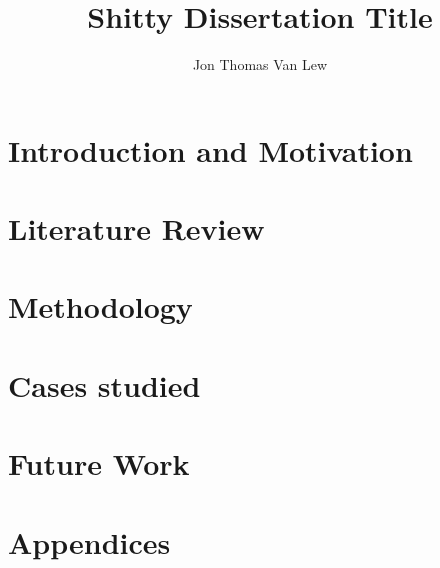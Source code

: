 \documentclass [PhD] {uclathes}
\title          {Shitty Dissertation Title}
\author         {Jon Thomas Van Lew}
\begin{document}



\tableofcontents               %
%



\part{Introduction and Motivation}



\part{Literature Review}




\part{Methodology}




\part{Cases studied}





\part{Future Work}

\part{Appendices}
\appendix





\end{document}
